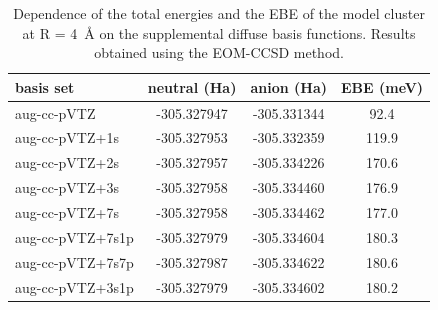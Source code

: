 \begin{table}
    \caption{\label{tab:diffusebasistuning}Dependence of the total energies and the EBE of the model  cluster at R = \SI{4}{\angstrom} on the supplemental diffuse basis functions. Results obtained using the EOM-CCSD method.}
\begin{tabular*}{\textwidth}{l@{\extracolsep{\fill}}ccc}
basis set            & neutral (Ha)  & anion (Ha)    & EBE (meV)            \\
\hline
aug-cc-pVTZ      & -305.327947          & -305.331344          &   92.4            \\
aug-cc-pVTZ+1s   & -305.327953          & -305.332359          &  119.9             \\
aug-cc-pVTZ+2s   & -305.327957          & -305.334226          &  170.6              \\
aug-cc-pVTZ+3s   & -305.327958          & -305.334460          &  176.9              \\
aug-cc-pVTZ+7s   & -305.327958          & -305.334462          &  177.0              \\ \hline
aug-cc-pVTZ+7s1p & -305.327979          & -305.334604          &  180.3              \\
aug-cc-pVTZ+7s7p & -305.327987          & -305.334622          &  180.6              \\ \hline
aug-cc-pVTZ+3s1p & -305.327979          & -305.334602          &  180.2     
\end{tabular*}
\end{table}


